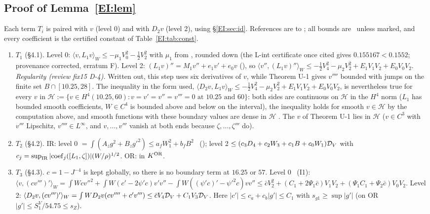 \documentclass[11pt]{article}
\begin{document}
\subsection{Proof of Lemma~\ref{EI:lem}}\label{EI:sec:proof}
Each term $T_i$ is paired with $v$ (level 0) and with $D_2v$ (level 2), using \S\ref{EI:sec:id}. References are to ; all bounds are \tHd\ unless marked, and every coefficient is the certified constant of Table~\ref{EI:tab:const}.
\begin{enumerate}[label=\textup{(\roman*)},leftmargin=2.2em]
\item $T_1$ (\S4.1). Level 0: $\langle v,L_1v\rangle_W\le-\mu_1V_0^2-\frac12V_2^2$ with $\mu_1$ from , rounded down (the L-int certificate once cited gives $0.155167<0.1552$; provenance corrected, erratum F). Level 2: $(L_1v)''=M_1v''+e_1v'+e_0v$ (), so $\langle v'',(L_1v)''\rangle_W\le-\frac12V_4^2-\mu_2V_2^2+E_1V_1V_2+E_0V_0V_2$. \emph{Regularity (review fix15 D-4).} Written out, this step uses six derivatives of $v$, while Theorem U-1 gives $v''''$ bounded with jumps on the finite set $B\cap[10.25,28]$. The inequality in the form used, $\langle D_2v,L_1v\rangle_W\le-\frac12V_4^2-\mu_2V_2^2+E_1V_1V_2+E_0V_0V_2$, is nevertheless true for every $v$ in $\mathcal H:=\{v\in H^4(10.25,60):v=v'=v''=v'''=0\text{ at }10.25\text{ and }60\}$: both sides are continuous on $\mathcal H$ in the $H^4$ norm ($L_1$ has bounded smooth coefficients, $W\in C^4$ is bounded above and below on the interval), the inequality holds for smooth $v\in\mathcal H$ by the computation above, and smooth functions with these boundary values are dense in $\mathcal H$ \tHd. The $v$ of Theorem U-1 lies in $\mathcal H$ ($v\in C^3$ with $v'''$ Lipschitz, $v''''\in L^\infty$, and $v,\dots,v'''$ vanish at both ends because $\zeta,\dots,\zeta'''$ do).
\item $T_2$ (\S4.2). IR: level 0 $=\int(A_zg^2+B_zg'^2)\le a_fW_1^2+b_fB^2$ \tC\ (); level 2 $\le(c_3D_4+c_2W_3+c_1B+c_0W_1)\mathcal D_V$ with $c_j=\sup_{\rm IR}|{\rm coef}_j([L_1,\zeta])|(W/\rho)^{1/2}$. OR: in $K^{\mathrm{OR}}$.
\item $T_3$ (\S4.3). $c=1-J^{-4}$ is kept globally, so there is no boundary term at $16.25$ or $57$. Level 0 \tS\ (I1): $\langle v,(cv''')'\rangle_W=\int Wcv''^2+\int W(c'-2\psi'c)v'v''-\int W((\psi'c)'-\psi'^2c)vv''\le\bar cV_2^2+(C_1+2\Psi_1\bar c)V_1V_2+(\Psi_1C_1+\Psi_2\bar c)V_0V_2$. Level 2: $\langle D_2v,(cv''')'\rangle_W=\int WD_2v(cv''''+c'v''')\le\bar cV_4\mathcal D_V+C_1V_3\mathcal D_V$. Here $|c'|\le c_a+c_b|g'|\le C_1$ with $s_{g1}\ge\sup|g'|$ (on OR $|g'|\le S^V_1/54.75\le s_Z$).

\end{enumerate}
\end{document}
